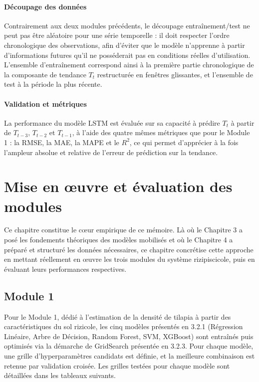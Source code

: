 \documentclass[a4paper,12pt, oneside]{article}
\begin{document}
\paragraph{Découpage des données\\}
Contrairement aux deux modules précédents, le découpage entraînement/test ne peut pas être aléatoire pour une série temporelle : il doit respecter l'ordre chronologique des observations, afin d'éviter que le modèle n'apprenne à partir d'informations futures qu'il ne posséderait pas en conditions réelles d'utilisation. L'ensemble d'entraînement correspond ainsi à la première partie chronologique de la composante de tendance $T_t$ restructurée en fenêtres glissantes, et l'ensemble de test à la période la plus récente.

\paragraph{Validation et métriques\\}
La performance du modèle LSTM est évaluée sur sa capacité à prédire $T_t$ à partir de $T_{t-3}$, $T_{t-2}$ et $T_{t-1}$, à l'aide des quatre mêmes métriques que pour le Module 1 : la RMSE, la MAE, la MAPE et le $R^2$, ce qui permet d'apprécier à la fois l'ampleur absolue et relative de l'erreur de prédiction sur la tendance.


\section{Mise en œuvre et évaluation des modules}

Ce chapitre constitue le cœur empirique de ce mémoire. Là où le Chapitre 3 a posé les fondements théoriques des modèles mobilisés et où le Chapitre 4 a préparé et structuré les données nécessaires, ce chapitre concrétise cette approche en mettant réellement en œuvre les trois modules du système rizipiscicole, puis en évaluant leurs performances respectives.

\subsection{Module 1}

Pour le Module 1, dédié à l'estimation de la densité de tilapia à partir des caractéristiques du sol rizicole, les cinq modèles présentés en 3.2.1 (Régression Linéaire, Arbre de Décision, Random Forest, SVM, XGBoost) sont entraînés puis optimisés via la démarche de GridSearch présentée en 3.2.3. Pour chaque modèle, une grille d'hyperparamètres candidats est définie, et la meilleure combinaison est retenue par validation croisée. Les grilles testées pour chaque modèle sont détaillées dans les tableaux suivants.
\end{document}
